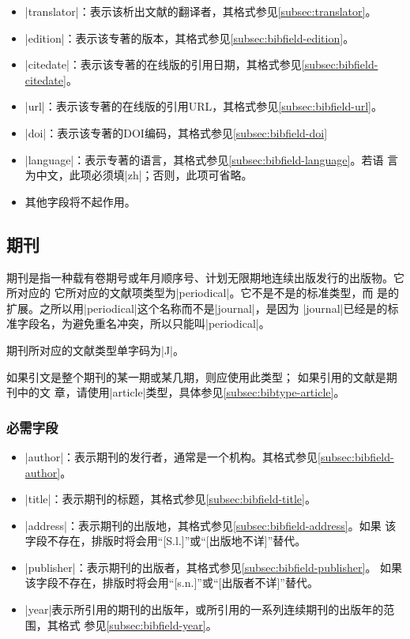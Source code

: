 \begin{itemize}
\item |translator|：表示该析出文献的翻译者，其格式参见\ref{subsec:translator}。
\item |edition|：表示该专著的版本，其格式参见\ref{subsec:bibfield-edition}。
\item |citedate|：表示该专著的在线版的引用日期，其格式参见\ref{subsec:bibfield-citedate}。
\item |url|：表示该专著的在线版的引用URL，其格式参见\ref{subsec:bibfield-url}。
\item |doi|：表示该专著的DOI编码，其格式参见\ref{subsec:bibfield-doi}
\item |language|：表示专著的语言，其格式参见\ref{subsec:bibfield-language}。若语
  言为中文，此项必须填|zh|；否则，此项可省略。
\item 其他字段将不起作用。
\end{itemize}

\subsection{期刊}\label{subsec:bibtype-periodical}

期刊是指一种载有卷期号或年月顺序号、计划无限期地连续出版发行的出版物。它所对应的
它所对应的{\BibTeX}文献项类型为|periodical|。它不是不是{\BibTeX}的标准类型，而
是{\njuthesis}的扩展。之所以用|periodical|这个名称而不是|journal|，是因为
|journal|已经是{\BibTeX}的标准字段名，为避免重名冲突，所以只能叫|periodical|。

期刊所对应的文献类型\cite{gbt3469-1983}单字码为|J|。

\begin{note}
如果引文是整个期刊的某一期或某几期，则应使用此类型； 如果引用的文献是期刊中的文
章，请使用|article|类型，具体参见\ref{subsec:bibtype-article}。
\end{note}

\subsubsection{必需字段}

\begin{itemize}
\item |author|：表示期刊的发行者，通常是一个机构。其格式参见\ref{subsec:bibfield-author}。
\item |title|：表示期刊的标题，其格式参见\ref{subsec:bibfield-title}。
\item |address|：表示期刊的出版地，其格式参见\ref{subsec:bibfield-address}。如果
  该字段不存在，{\BibTeX}排版时将会用``[S.l.]''或``[出版地不详]''替代。
\item |publisher|：表示期刊的出版者，其格式参见\ref{subsec:bibfield-publisher}。
  如果该字段不存在，{\BibTeX}排版时将会用``[s.n.]''或``[出版者不详]''替代。
\item |year|表示所引用的期刊的出版年，或所引用的一系列连续期刊的出版年的范围，其格式
  参见\ref{subsec:bibfield-year}。
\end{itemize}

